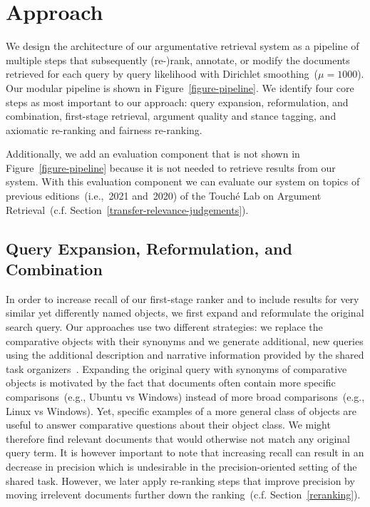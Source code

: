 \section{Approach}\label{approach}



We design the architecture of our argumentative retrieval system as a pipeline of multiple steps that subsequently (re-)rank, annotate, or modify the documents retrieved for each query by query likelihood with Dirichlet smoothing~(\(\mu = 1000\)). Our modular pipeline is shown in Figure~\ref{figure-pipeline}.
We identify four core steps as most important to our approach:
\Ni query expansion, reformulation, and combination,
\Nii first-stage retrieval,
\Niii argument quality and stance tagging,
and \Niv axiomatic re-ranking and fairness re-ranking.

Additionally, we add an evaluation component that is not shown in Figure~\ref{figure-pipeline} because it is not needed to retrieve results from our system.
With this evaluation component we can evaluate our system on topics of previous editions~(i.e.,~2021 and~2020) of the Touché Lab on Argument Retrieval~(c.f. Section~\ref{transfer-relevance-judgements}).

\subsection{Query Expansion, Reformulation, and Combination}
\label{reformulation}

In order to increase recall of our first-stage ranker and to include results for very similar yet differently named objects, we first expand and reformulate the original search query.
Our approaches use two different strategies: \Ni we replace the comparative objects with their synonyms and \Nii we generate additional, new queries using the additional description and narrative information provided by the shared task organizers~\cite{BondarenkoFKSGBPBSWPH2022}.
Expanding the original query with synonyms of comparative objects is motivated by the fact that documents often contain more specific comparisons~(e.g., Ubuntu vs Windows) instead of more broad comparisons~(e.g., Linux vs Windows).
Yet, specific examples of a more general class of objects are useful to answer comparative questions about their object class.
We might therefore find relevant documents that would otherwise not match any original query term.
It is however important to note that increasing recall can result in an decrease in precision which is undesirable in the precision-oriented setting of the shared task.
However, we later apply re-ranking steps that improve precision by moving irrelevent documents further down the ranking~(c.f. Section~\ref{reranking}).

